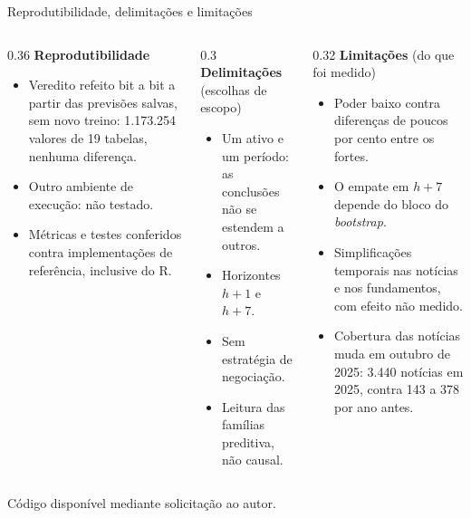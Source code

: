 \documentclass[aspectratio=169,10pt]{beamer}
\newcommand{\hum}{\(h{+}1\)}
\newcommand{\hsete}{\(h{+}7\)}
\begin{document}
\begin{frame}{Reprodutibilidade, delimitações e limitações}
  \begin{columns}[T]
    \begin{column}{0.36\textwidth}
      \footnotesize
      \textbf{Reprodutibilidade}
      \begin{itemize}
        \item Veredito refeito bit a bit a partir das previsões salvas, sem novo
          treino: 1.173.254 valores de 19 tabelas, nenhuma diferença.
        \item Outro ambiente de execução: não testado.
        \item Métricas e testes conferidos contra implementações de referência,
          inclusive do R.
      \end{itemize}
    \end{column}
    \begin{column}{0.3\textwidth}
      \footnotesize
      \textbf{Delimitações} (escolhas de escopo)
      \begin{itemize}
        \item Um ativo e um período: as conclusões não se estendem a outros.
        \item Horizontes \hum{} e \hsete.
        \item Sem estratégia de negociação.
        \item Leitura das famílias preditiva, não causal.
      \end{itemize}
    \end{column}
    \begin{column}{0.32\textwidth}
      \footnotesize
      \textbf{Limitações} (do que foi medido)
      \begin{itemize}
        \item Poder baixo contra diferenças de poucos por cento entre os fortes.
        \item O empate em \hsete{} depende do bloco do \textit{bootstrap}.
        \item Simplificações temporais nas notícias e nos fundamentos, com efeito não medido.
        \item Cobertura das notícias muda em outubro de 2025: 3.440 notícias em 2025, contra
          143 a 378 por ano antes.
      \end{itemize}
    \end{column}
  \end{columns}
  \vspace{4pt}
  \centering\footnotesize Código disponível mediante solicitação ao autor.
\end{frame}
\end{document}
